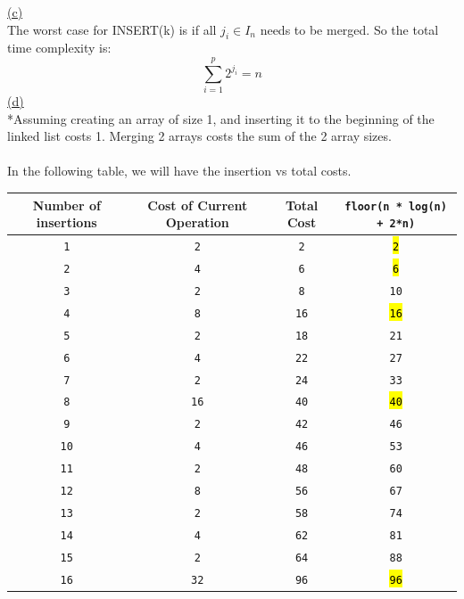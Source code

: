 \documentclass[12pt]{article}
\newcommand{\code}[1]{{\ttfamily \fontseries{b}\selectfont #1}}
\begin{document}
\noindent \hyperlink{toc}{\hypertarget{2.3}{(c)}}\\
The worst case for \code{INSERT(k)} is if all $j_i \in I_n$ needs to be merged. So the total time complexity is:
$$\sum_{i=1}^{p} 2^{j_i} = n$$
\newpage
\noindent \hyperlink{toc}{\hypertarget{2.4}{(d)}}\\
*Assuming creating an array of size 1, and inserting it to the beginning of the linked list costs 1. Merging 2 arrays costs the sum of the 2 array sizes.
\\\\
In the following table, we will have the insertion vs total costs.
\begin{center}
	\begin{tabular}{|c|c|c|c|}
		\hline \cellcolor{gray!25}Number of insertions & \cellcolor{gray!25}Cost of Current Operation & \cellcolor{gray!25}Total Cost & \cellcolor{gray!25}\texttt{floor(n * log(n) + 2*n)} \\
		\hline\hline
		\texttt{1}  & \texttt{2}  & \texttt{2}  & \hl{\texttt{2}}  \\\hline
		\texttt{2}  & \texttt{4}  & \texttt{6}  & \hl{\texttt{6}}  \\\hline
		\texttt{3}  & \texttt{2}  & \texttt{8}  & \texttt{10} \\\hline
		\texttt{4}  & \texttt{8}  & \texttt{16} & \hl{\texttt{16}} \\\hline
		\texttt{5}  & \texttt{2}  & \texttt{18} & \texttt{21} \\\hline
		\texttt{6}  & \texttt{4}  & \texttt{22} & \texttt{27} \\\hline
		\texttt{7}  & \texttt{2}  & \texttt{24} & \texttt{33} \\\hline
		\texttt{8}  & \texttt{16} & \texttt{40} & \hl{\texttt{40}} \\\hline
		\texttt{9}  & \texttt{2}  & \texttt{42} & \texttt{46} \\\hline
		\texttt{10} & \texttt{4}  & \texttt{46} & \texttt{53} \\\hline
		\texttt{11} & \texttt{2}  & \texttt{48} & \texttt{60} \\\hline
		\texttt{12} & \texttt{8}  & \texttt{56} & \texttt{67} \\\hline
		\texttt{13} & \texttt{2}  & \texttt{58} & \texttt{74} \\\hline
		\texttt{14} & \texttt{4}  & \texttt{62} & \texttt{81} \\\hline
		\texttt{15} & \texttt{2}  & \texttt{64} & \texttt{88} \\\hline
		\texttt{16} & \texttt{32} & \texttt{96} & \hl{\texttt{96}} \\\hline
	\end{tabular}
\end{center}
\end{document}
